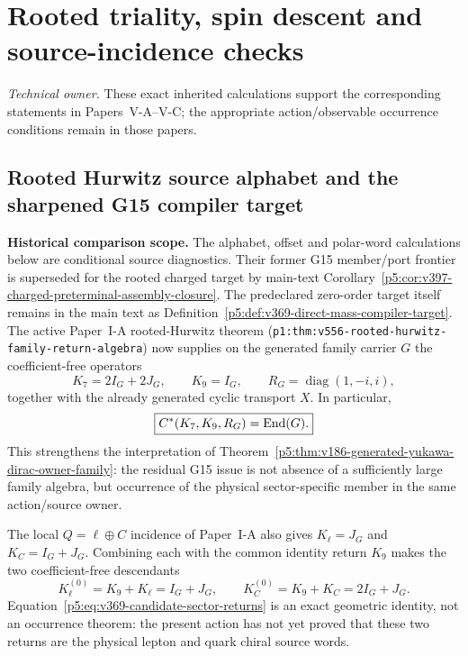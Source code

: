 \documentclass[11pt,a4paper]{article}
\begin{document}

\section{Rooted triality, spin descent and source-incidence checks}
\label{p5d:sec:B}
\noindent\textit{Technical owner.} These exact inherited calculations
support the corresponding statements in Papers~V-A--V-C;
the appropriate action/observable occurrence conditions remain in those papers.
\subsection{Rooted Hurwitz source alphabet and the sharpened G15 compiler target}
\label{p5:sec:v369-rooted-hurwitz-g15-target}
\noindent\textbf{Historical comparison scope.} The alphabet, offset and
polar-word calculations below are conditional source diagnostics. Their
former G15 member/port frontier is superseded for the rooted charged target
by main-text Corollary~\ref{p5:cor:v397-charged-preterminal-assembly-closure}.
The predeclared zero-order target itself remains in the main text as
Definition~\ref{p5:def:v369-direct-mass-compiler-target}.
The active Paper~I-A rooted-Hurwitz theorem
(\texttt{p1:thm:v556-rooted-hurwitz-family-return-algebra}) now supplies on the generated family carrier \(G\) the coefficient-free
operators
\[
 K_7=2I_G+2J_G,\qquad K_9=I_G,
 \qquad R_G=\operatorname{diag}(1,-i,i),
\]
together with the already generated cyclic transport \(X\).  In particular,
\[
 \boxed{C^*(K_7,K_9,R_G)=\operatorname{End}(G).}
\]
This strengthens the interpretation of
Theorem~\ref{p5:thm:v186-generated-yukawa-dirac-owner-family}: the residual
G15 issue is not absence of a sufficiently large family algebra, but
occurrence of the physical sector-specific member in the same action/source
owner.

The local \(Q=\ell\oplus C\) incidence of Paper~I-A also gives
\(K_\ell=J_G\) and \(K_C=I_G+J_G\).  Combining each with the common identity
return \(K_9\) makes the two coefficient-free descendants
\begin{equation}
\label{p5:eq:v369-candidate-sector-returns}
 K_\ell^{(0)}=K_9+K_\ell=I_G+J_G,
 \qquad
 K_C^{(0)}=K_9+K_C=2I_G+J_G.
\end{equation}
Equation~\eqref{p5:eq:v369-candidate-sector-returns} is an exact geometric
identity, not an occurrence theorem: the present action has not yet proved
that these two returns are the physical lepton and quark chiral source words.
\end{document}
